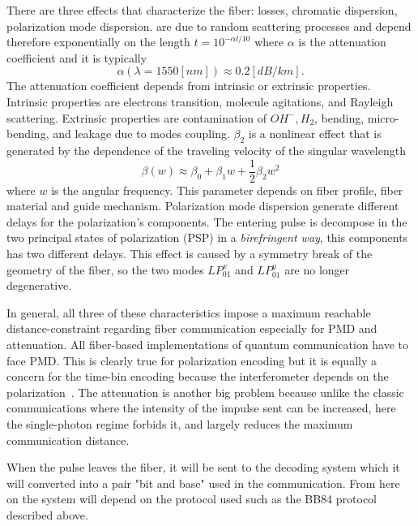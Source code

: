 There are three effects that characterize the fiber: losses, chromatic dispersion, polarization mode dispersion.  are due to random scattering processes and depend therefore exponentially on the length $t = 10^{-\alpha l / 10}$ where $\alpha$ is the attenuation coefficient and it is typically
\begin{equation}
  \alpha(\lambda = 1550[nm]) \approx 0.2 [dB / km].
\end{equation}
The attenuation coefficient depends from intrinsic or extrinsic properties. Intrinsic properties are electrons transition, molecule agitations, and Rayleigh scattering. Extrinsic properties are contamination of $OH^-, H_2$, bending, micro-bending, and leakage due to modes coupling.  $\beta_2$ is a nonlinear effect that is generated by the dependence of the traveling velocity of the singular wavelength
\begin{equation}
  \beta(w) \approx \beta_0 + \beta_1 w + \frac{1}{2} \beta_2 w^2
\end{equation}
where $w$ is the angular frequency. This parameter depends on fiber profile, fiber material and guide mechanism. Polarization mode dispersion  generate different delays for the polarization's components. The entering pulse is decompose in the two principal states of polarization (PSP) in a \textit{birefringent way}, this components has two different delays. This effect is caused by a symmetry break of the geometry of the fiber, so the two modes $LP_{01}^x$ and $LP_{01}^y$ are no longer degenerative.

In general, all three of these characteristics impose a maximum reachable distance-constraint regarding fiber communication especially for PMD and attenuation. All fiber-based implementations of quantum communication have to face PMD. This is clearly true for polarization encoding but it is equally a concern for the time-bin encoding because the interferometer depends on the polarization~\cite{a25}. The attenuation is another big problem because unlike the classic communications where the intensity of the impulse sent can be increased, here the single-photon regime forbids it, and largely reduces the maximum communication distance.

When the pulse leaves the fiber, it will be sent to the decoding system which it will converted into a pair "bit and base" used in the communication. From here on the system will depend on the protocol used such as the BB84 protocol described above.

